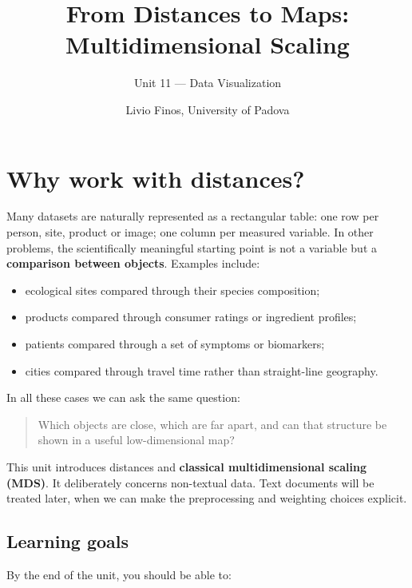 \documentclass[
  english,
]{article}
\title{From Distances to Maps: Multidimensional Scaling}
\subtitle{Unit 11 --- Data Visualization}
\author{Livio Finos, University of Padova}
\date{}
\providecommand{\tightlist}{%
  \setlength{\itemsep}{0pt}\setlength{\parskip}{0pt}}
\begin{document}
\maketitle

{
\setcounter{tocdepth}{3}
\tableofcontents
}
\section{Why work with distances?}\label{why-work-with-distances}

Many datasets are naturally represented as a rectangular table: one row
per person, site, product or image; one column per measured variable. In
other problems, the scientifically meaningful starting point is not a
variable but a \textbf{comparison between objects}. Examples include:

\begin{itemize}
\tightlist
\item
  ecological sites compared through their species composition;
\item
  products compared through consumer ratings or ingredient profiles;
\item
  patients compared through a set of symptoms or biomarkers;
\item
  cities compared through travel time rather than straight-line
  geography.
\end{itemize}

In all these cases we can ask the same question:

\begin{quote}
Which objects are close, which are far apart, and can that structure be
shown in a useful low-dimensional map?
\end{quote}

This unit introduces distances and \textbf{classical multidimensional
scaling (MDS)}. It deliberately concerns non-textual data. Text
documents will be treated later, when we can make the preprocessing and
weighting choices explicit.

\subsection{Learning goals}\label{learning-goals}

By the end of the unit, you should be able to:
\end{document}
